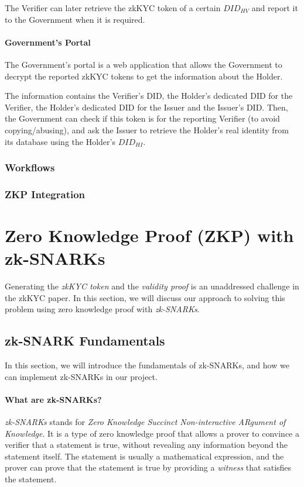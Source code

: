 \documentclass[
]{report}
\begin{document}
The Verifier can later retrieve the zkKYC token of a certain ${DID_{HV}}$
and report it to the Government when it is required.

\subsubsection{Government's Portal}
The Government's portal is a web application that allows the Government to
decrypt the reported zkKYC tokens to get the information about the Holder.

The information contains the Verifier's DID, the Holder's dedicated DID for
the Verifier, the Holder's dedicated DID for the Issuer and the Issuer's
DID. Then, the Government can check if this token is for the reporting
Verifier (to avoid copying/abusing), and ask the Issuer to retrieve the
Holder's real identity from its database using the Holder's $DID_{HI}$.

\subsection{Workflows}
\subsection{ZKP Integration}

\chapter{Zero Knowledge Proof (ZKP) with zk-SNARKs}

Generating the \emph{zkKYC token} and the \emph{validity proof} is an
unaddressed challenge in the zkKYC paper. In this section, we will
discuss our approach to solving this problem using zero knowledge proof
with \emph{zk-SNARKs}.

\section{zk-SNARK Fundamentals}

In this section, we will introduce the fundamentals of zk-SNARKs, and
how we can implement zk-SNARKs in our project.

\subsubsection{What are zk-SNARKs?}

\emph{zk-SNARKs} stands for \emph{Zero Knowledge Succinct
Non-interactive ARgument of Knowledge}. It is a type of zero knowledge
proof that allows a prover to convince a verifier that a statement is
true, without revealing any information beyond the statement itself. The
statement is usually a mathematical expression, and the prover can prove
that the statement is true by providing a \emph{witness} that satisfies
the statement.
\end{document}
